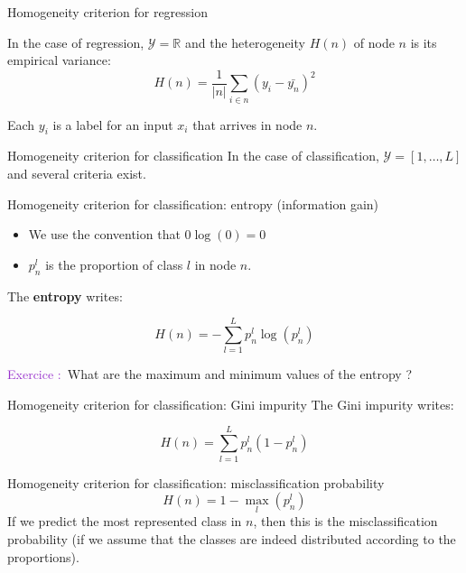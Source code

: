 \documentclass[usenames,dvipsnames]{beamer}
\newcounter{numexos}%
\newcommand{\exercice}[1]{%
\addtocounter{numexos}{1}%
\textcolor{DarkOrchid}{Exercice\,\thenumexos\,:}\,#1%
}
\begin{document}
\begin{frame}{Homogeneity criterion for regression}

    In the case of regression, $ \mathcal{Y}  = \mathbb{R} $ and the heterogeneity $H(n)$ of node $n$ is its empirical variance:
    \begin{equation}
	H(n) = \frac{1}{|n|} \sum_{i\in n} (y_i - \bar{y_n})^2
    \end{equation}

    Each $y_i$ is a label for an input $x_i$ that arrives in node $n$.
    
\end{frame}

\begin{frame}{Homogeneity criterion for classification}
    In the case of classification, $ \mathcal{Y}  = [1, \dots, L]$ and several criteria exist.  
\end{frame}

\begin{frame}{Homogeneity criterion for classification: entropy (information gain)}
    \begin{itemize}
        \item We use the convention that $ 0 \log (0) = 0$
	\item $p_n^l$ is the proportion of class $ l$ in node $n$.
    \end{itemize}
    The \textbf{{entropy}} writes:

    \begin{equation}
	H(n) = - \sum^{L}_{l=1} p_n^l\log( p_n^l)
    \end{equation}

    \exercice{\textbf{}}What are the maximum and minimum values of the entropy ?
\end{frame}

\begin{frame}{Homogeneity criterion for classification: Gini impurity}
    The Gini impurity writes:

    \begin{equation}
	H(n) = \sum^{L}_{l=1} p_n^l(1-p_n^l)
    \end{equation}
\end{frame}

\begin{frame}{Homogeneity criterion for classification: misclassification probability}
    \begin{equation}
	H(n) = 1-  \max_l(p_n^l)
    \end{equation}
    If we predict the most represented class in $n$, then this is the misclassification probability (if we assume that the classes are indeed distributed according to the proportions).
\end{frame}
\end{document}

